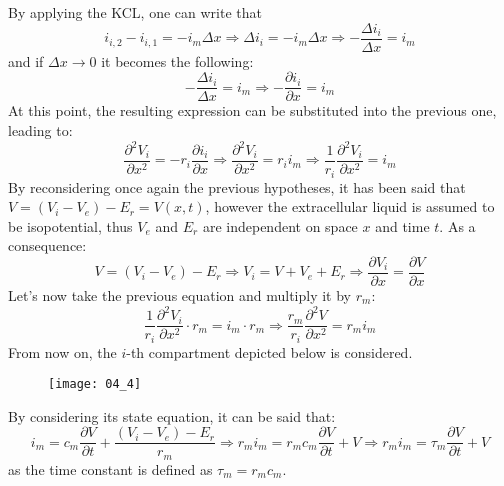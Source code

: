 By applying the KCL, one can write that
\begin{equation*}
    i_{i,2}-i_{i,1}=-i_{m}\Delta{x}
    \Rightarrow
    \Delta{i_{i}}=-i_{m}\Delta{x}
    \Rightarrow
    -\frac{\Delta{i_{i}}}{\Delta{x}}=i_{m}
\end{equation*}
and if \(\Delta{x}\to{0}\) it becomes the following:
\begin{equation*}
    -\frac{\Delta{i_{i}}}{\Delta{x}}=i_{m}
    \Rightarrow
    -\frac{\partial{i_{i}}}{\partial{x}}=i_{m}
\end{equation*}
At this point, the resulting expression can be substituted into the previous one, leading to:
\begin{equation*}
    \frac{\partial^{2}V_{i}}{\partial{x^{2}}}=-r_{i}\frac{\partial{i_{i}}}{\partial{x}}
    \Rightarrow
    \frac{\partial^{2}V_{i}}{\partial{x^{2}}}=r_{i}i_{m}
    \Rightarrow
    \frac{1}{r_{i}}\frac{\partial^{2}V_{i}}{\partial{x^{2}}}=i_{m}
\end{equation*}
By reconsidering once again the previous hypotheses, it has been said that \(V=(V_{i}-V_{e})-E_{r}=V(x,t)\),
however the extracellular liquid is assumed to be isopotential, thus \(V_{e}\) and \(E_{r}\) are
independent on space \(x\) and time \(t\). As a consequence:
\begin{equation*}
    V=(V_{i}-V_{e})-E_{r}
    \Rightarrow
    V_{i}=V+V_{e}+E_{r}
    \Rightarrow
    \frac{\partial{V_{i}}}{\partial{x}}=\frac{\partial{V}}{\partial{x}}
\end{equation*}
Let's now take the previous equation and multiply it by \(r_{m}\):
\begin{equation*}
    \frac{1}{r_{i}}\frac{\partial^{2}V_{i}}{\partial{x^{2}}}\cdot{r_{m}}=i_{m}\cdot{r_{m}}
    \Rightarrow
    \frac{r_{m}}{r_{i}}\frac{\partial^{2}V}{\partial{x^{2}}}=r_{m}i_{m}
\end{equation*}
From now on, the \(i\)-th compartment depicted below is considered.
\begin{figure}[H]
    \texttt{[image: 04\_4]}
    \centering
\end{figure}
By considering its state equation, it can be said that:
\begin{equation*}
    i_{m}=c_{m}\frac{\partial{V}}{\partial{t}}+\frac{(V_{i}-V_{e})-E_{r}}{r_{m}}
    \Rightarrow
    r_{m}i_{m}=r_{m}c_{m}\frac{\partial{V}}{\partial{t}}+V
    \Rightarrow
    r_{m}i_{m}=\tau_{m}\frac{\partial{V}}{\partial{t}}+V
\end{equation*}
as the time constant is defined as \(\tau_{m}=r_{m}c_{m}\).\\
